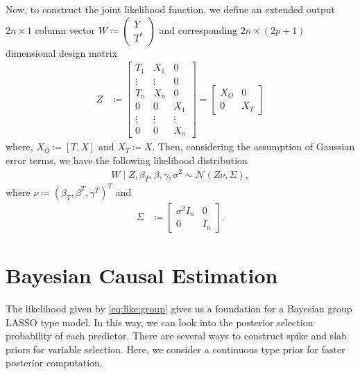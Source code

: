 \documentclass[preprint,12pt]{elsarticle}
\newcommand{\normal}{\mathcal{N}}
\begin{document}
Now, to construct the joint likelihood function, we define an extended
output $2n\times 1$ column vector
$W\coloneqq\left(\begin{smallmatrix}Y \\ T^*\end{smallmatrix}\right)$
and corresponding $2n\times(2p+1)$ dimensional design matrix
\begin{align}
	Z &\coloneqq
        \begin{bmatrix}
           T_1 & X_1 & 0 \\
           \vdots & \vdots & 0 \\
           T_n & X_n & 0 \\
           0 & 0 & X_1 \\
           \vdots & \vdots & \vdots \\
           0 & 0 & X_n
        \end{bmatrix}
        =
	\begin{bmatrix}
		X_O & 0 \\
		0 & X_T
	\end{bmatrix}
\end{align}
where, $X_O \coloneqq [T, X]$ and $X_T \coloneqq X$. Then, considering the assumption of
Gaussian error terms, we have the following likelihood distribution
\begin{align}
	W\mid Z, \beta_T, \beta, \gamma, \sigma^2 \sim\normal\left(Z\nu, \Sigma\right)\label{eq:like:group},
\end{align}
where $\nu \coloneqq (\beta_T, \beta^T, \gamma^T)^T$ and
\begin{align}
	\Sigma &\coloneqq
	\begin{bmatrix}
		\sigma^2{I}_n & 0 \\
		0 & {I}_n
	\end{bmatrix}.
\end{align}


\section{Bayesian Causal Estimation}\label{sec:bayes}

The likelihood given by \cref{eq:like:group} gives us
a foundation for a Bayesian group LASSO 
\citep{xu2015} type model. In this way, we can look into the posterior selection
probability of each predictor. There are several
ways to construct spike and slab priors for
variable selection. Here, we consider a continuous type
prior \citep{ishwaran2005} for faster posterior
computation.
\end{document}
